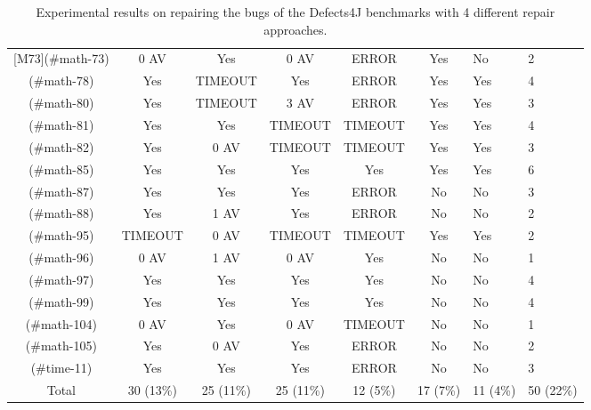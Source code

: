 \begin{table}[!t]
{\begin{tabular}{|c|c|c|c|c|c|}
[M73](#math-73)   & 0 AV      & Yes       & 0 AV      & ERROR     & Yes       & No        &      2 \\
[M78](#math-78)   & Yes       & TIMEOUT   & Yes       & ERROR     & Yes       & Yes       &      4 \\
[M80](#math-80)   & Yes       & TIMEOUT   & 3 AV      & ERROR     & Yes       & Yes       &      3 \\
[M81](#math-81)   & Yes       & Yes       & TIMEOUT   & TIMEOUT   & Yes       & Yes       &      4 \\
[M82](#math-82)   & Yes       & 0 AV      & TIMEOUT   & TIMEOUT   & Yes       & Yes       &      3 \\
[M85](#math-85)   & Yes       & Yes       & Yes       & Yes       & Yes       & Yes       &      6 \\
[M87](#math-87)   & Yes       & Yes       & Yes       & ERROR     & No        & No        &      3 \\
[M88](#math-88)   & Yes       & 1 AV      & Yes       & ERROR     & No        & No        &      2 \\
[M95](#math-95)   & TIMEOUT   & 0 AV      & TIMEOUT   & TIMEOUT   & Yes       & Yes       &      2 \\
[M96](#math-96)   & 0 AV      & 1 AV      & 0 AV      & Yes       & No        & No        &      1 \\
[M97](#math-97)   & Yes       & Yes       & Yes       & Yes       & No        & No        &      4 \\
[M99](#math-99)   & Yes       & Yes       & Yes       & Yes       & No        & No        &      4 \\
[M104](#math-104) & 0 AV      & Yes       & 0 AV      & TIMEOUT   & No        & No        &      1 \\
[M105](#math-105) & Yes       & 0 AV      & Yes       & ERROR     & No        & No        &      2 \\
\hline
[T11](#time-11)   & Yes       & Yes       & Yes       & ERROR     & No        & No        &      3 \\
\hline
Total             & 30 (13\%) & 25 (11\%) & 25 (11\%) & 12 (5\%)  & 17 (7\%)  & 11 (4\%)  & 50 (22\%)\\
\hline 
\end{tabular}%
}
\caption{Experimental results on repairing the bugs of the Defects4J benchmarks with 4 different repair approaches.}
\end{table}
